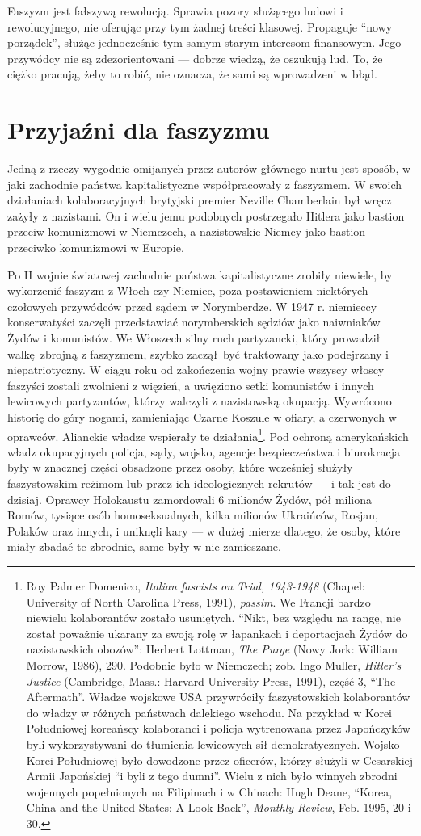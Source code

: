 \documentclass[12pt]{book}
\newcommand{\sekcja}[1]{
  \addcontentsline{toc}{section}{#1}
  \section*{#1}
}
\begin{document}
Faszyzm jest fałszywą rewolucją. Sprawia pozory służącego ludowi i rewolucyjnego, nie oferując przy tym żadnej treści klasowej. Propaguje ``nowy porządek'', służąc jednocześnie tym samym starym interesom finansowym. Jego przywódcy nie są zdezorientowani — dobrze wiedzą, że oszukują lud. To, że ciężko pracują, żeby to robić, nie oznacza, że sami są wprowadzeni w błąd.

\sekcja{Przyjaźni dla faszyzmu}
Jedną z rzeczy wygodnie omijanych przez autorów głównego nurtu jest sposób, w jaki zachodnie państwa kapitalistyczne współpracowały z faszyzmem. W swoich działaniach kolaboracyjnych brytyjski premier Neville Chamberlain był wręcz zażyły z nazistami. On i wielu jemu podobnych postrzegało Hitlera jako bastion przeciw komunizmowi w Niemczech, a nazistowskie Niemcy jako bastion przeciwko komunizmowi w Europie.

Po II wojnie światowej zachodnie państwa kapitalistyczne zrobiły niewiele, by wykorzenić faszyzm z Włoch czy Niemiec, poza postawieniem niektórych czołowych przywódców przed sądem w Norymberdze. W 1947 r. niemieccy konserwatyści zaczęli przedstawiać norymberskich sędziów jako naiwniaków Żydów i komunistów.  We Włoszech silny ruch partyzancki, który prowadził walkę zbrojną z faszyzmem, szybko zaczął być traktowany jako podejrzany i niepatriotyczny. W ciągu roku od zakończenia wojny prawie wszyscy włoscy faszyści zostali zwolnieni z więzień, a uwięziono setki komunistów i innych lewicowych partyzantów, którzy walczyli z nazistowską okupacją. Wywrócono historię do góry nogami, zamieniając Czarne Koszule w ofiary, a czerwonych w oprawców. Alianckie władze wspierały te działania\footnote{Roy Palmer Domenico, \textit{Italian fascists on Trial, 1943-1948} (Chapel: University of North Carolina Press, 1991), \textit{passim}. We Francji bardzo niewielu kolaborantów zostało usuniętych. ``Nikt, bez względu na rangę, nie został poważnie ukarany za swoją rolę w łapankach i deportacjach Żydów do nazistowskich obozów'': Herbert Lottman, \textit{The Purge} (Nowy Jork: William Morrow, 1986), 290. Podobnie było w Niemczech; zob. Ingo Muller, \textit{Hitler's Justice} (Cambridge, Mass.: Harvard University Press, 1991), część 3, ``The Aftermath''. Władze wojskowe USA przywróciły faszystowskich kolaborantów do władzy w różnych państwach dalekiego wschodu. Na przykład w Korei Południowej koreańscy kolaboranci i policja wytrenowana przez Japończyków byli wykorzystywani do tłumienia lewicowych sił demokratycznych. Wojsko Korei Południowej było dowodzone przez oficerów, którzy służyli w Cesarskiej Armii Japońskiej ``i byli z tego dumni''. Wielu z nich było winnych zbrodni wojennych popełnionych na Filipinach i w Chinach: Hugh Deane, ``Korea, China and the United States: A Look Back'', \textit{Monthly Review}, Feb. 1995, 20 i 30.}. Pod ochroną amerykańskich władz okupacyjnych policja, sądy, wojsko, agencje bezpieczeństwa i biurokracja były w znacznej części obsadzone przez osoby, które wcześniej służyły faszystowskim reżimom lub przez ich ideologicznych rekrutów — i tak jest do dzisiaj. Oprawcy Holokaustu zamordowali 6 milionów Żydów, pół miliona Romów, tysiące osób homoseksualnych, kilka milionów Ukraińców, Rosjan, Polaków oraz innych, i uniknęli kary — w dużej mierze dlatego, że osoby, które miały zbadać te zbrodnie, same były w nie zamieszane.
\end{document}
